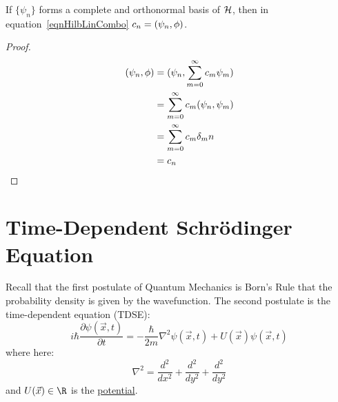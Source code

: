 \documentclass[../Main.tex]{subfiles}
\begin{document}
\begin{lemma}
    If $\{\psi_n\}$ forms a complete and orthonormal basis of $\mathcal{H}$, then  in equation~\ref{eqnHilbLinCombo} $c_n = (\psi_n,\phi)$.
    \label{lemLinComboCoeffts}
\end{lemma}
\begin{proof}
    \begin{align*}
        (\psi_n,\phi) 
        &= (\psi_n,\sum_{m = 0}^\infty c_m \psi_m) \\
        &= \sum_{m = 0}^{\infty}c_m (\psi_n,\psi_m) \\
        &= \sum_{m = 0}^{\infty} c_m \delta_mn \\
        &= c_n
    \end{align*}
\end{proof}
\section{Time-Dependent Schr\"odinger Equation}
Recall that the first postulate of Quantum Mechanics is Born's Rule that the probability density is given by the wavefunction. The second postulate is the time-dependent \schr equation (TDSE):
\begin{equation}
    i\hbar \frac{\partial \psi(\vec{x}, t)}{\partial t} = -\frac{\hbar}{2m}\nabla^2 \psi(\vec{x}, t) + U(\vec{x})\psi(\vec{x}, t)
    \label{eqnTDSE}
\end{equation}
where here:
\begin{equation*}
    \nabla^2 = \frac{d^2}{dx^2} + \frac{d^2}{dy^2} + \frac{d^2}{dy^2}
\end{equation*}
and $U(\vec{x}) \in \R$ is the \underline{potential}.
\end{document}
